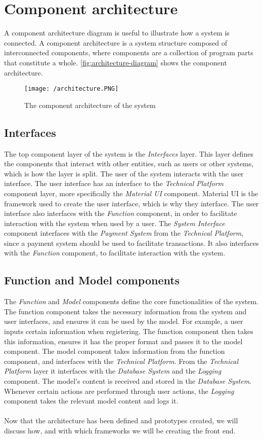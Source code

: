 \section{Component architecture}
A component architecture diagram is useful to illustrate how a system is connected.
A component architecture is a system structure composed of interconnected components, where components are a collection of program parts that constitute a whole\cite{OOAD}.
\autoref{fig:architecture-diagram} shows the component architecture.

\begin{figure}[]
    \texttt{[image: /architecture.PNG]}
    \caption{The component architecture of the system}
    \label{fig:architecture-diagram}
\end{figure}

\subsection{Interfaces}
The top component layer of the system is the \textit{Interfaces} layer.
This layer defines the components that interact with other entities, such as users or other systems, which is how the layer is split.
The user of the system interacts with the user interface.
The user interface has an interface to the \textit{Technical Platform} component layer, more specifically the \textit{Material UI} component.
Material UI is the framework used to create the user interface, which is why they interface.
The user interface also interfaces with the \textit{Function} component, in order to facilitate interaction with the system when used by a user. 
The \textit{System Interface} component interfaces with the \textit{Payment System} from the \textit{Technical Platform}, since a payment system should be used to facilitate transactions.
It also interfaces with the \textit{Function} component, to facilitate interaction with the system.

\subsection{Function and Model components}
The \textit{Function} and \textit{Model} components define the core functionalities of the system.
The function component takes the necessary information from the system and user interfaces, and ensures it can be used by the model.
For example, a user inputs certain information when registering. 
The function component then takes this information, ensures it has the proper format and passes it to the model component.
The model component takes information from the function component, and interfaces with the \textit{Technical Platform}.
From the \textit{Technical Platform} layer it interfaces with the \textit{Database System} and the \textit{Logging} component.
The model's content is received and stored in the \textit{Database System}.
Whenever certain actions are performed through user actions, the \textit{Logging} component takes the relevant model content and logs it.
\\\\
Now that the architecture has been defined and prototypes created, we will discuss how, and with which frameworks we will be creating the front end.

